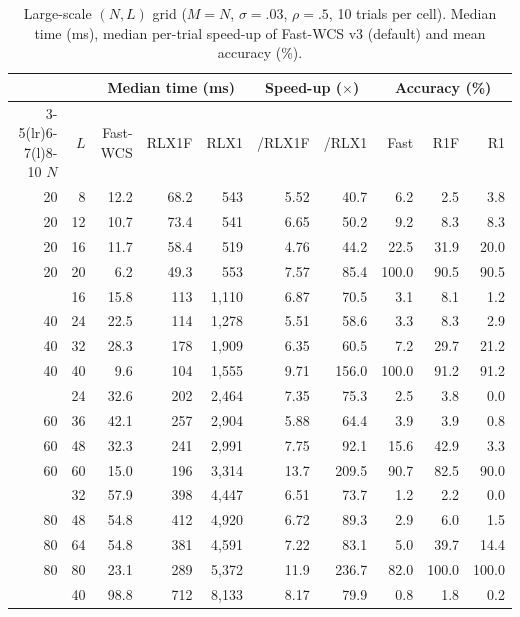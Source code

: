 \begin{table}[!t]
\centering
\caption{Large-scale $(N,L)$ grid ($M{=}N$, $\sigma{=}.03$, $\rho{=}.5$, 10 trials per cell). Median time (ms), median per-trial speed-up of Fast-WCS v3 (default) and mean accuracy (\%).}
\label{tab:grid}
\fontsize{5.9}{7.0}\selectfont
\setlength{\tabcolsep}{1.3pt}
\begin{tabular*}{\columnwidth}{@{\extracolsep{\fill}}rrrrrrrrrr@{}}
\toprule
 & & \multicolumn{3}{c}{Median time (ms)} & \multicolumn{2}{c}{Speed-up ($\times$)} & \multicolumn{3}{c}{Accuracy (\%)} \\
\cmidrule(lr){3-5}\cmidrule(lr){6-7}\cmidrule(l){8-10}
$N$ & $L$ & Fast-WCS & RLX1F & RLX1 & /RLX1F & /RLX1 & Fast & R1F & R1 \\
\midrule
20 & 8 & 12.2 & 68.2 & 543 & 5.52 & 40.7 & 6.2 & 2.5 & 3.8 \\
20 & 12 & 10.7 & 73.4 & 541 & 6.65 & 50.2 & 9.2 & 8.3 & 8.3 \\
20 & 16 & 11.7 & 58.4 & 519 & 4.76 & 44.2 & 22.5 & 31.9 & 20.0 \\
20 & 20 & 6.2 & 49.3 & 553 & 7.57 & 85.4 & 100.0 & 90.5 & 90.5 \\
\addlinespace[1pt]
40 & 16 & 15.8 & 113 & 1{,}110 & 6.87 & 70.5 & 3.1 & 8.1 & 1.2 \\
40 & 24 & 22.5 & 114 & 1{,}278 & 5.51 & 58.6 & 3.3 & 8.3 & 2.9 \\
40 & 32 & 28.3 & 178 & 1{,}909 & 6.35 & 60.5 & 7.2 & 29.7 & 21.2 \\
40 & 40 & 9.6 & 104 & 1{,}555 & 9.71 & 156.0 & 100.0 & 91.2 & 91.2 \\
\addlinespace[1pt]
60 & 24 & 32.6 & 202 & 2{,}464 & 7.35 & 75.3 & 2.5 & 3.8 & 0.0 \\
60 & 36 & 42.1 & 257 & 2{,}904 & 5.88 & 64.4 & 3.9 & 3.9 & 0.8 \\
60 & 48 & 32.3 & 241 & 2{,}991 & 7.75 & 92.1 & 15.6 & 42.9 & 3.3 \\
60 & 60 & 15.0 & 196 & 3{,}314 & 13.7 & 209.5 & 90.7 & 82.5 & 90.0 \\
\addlinespace[1pt]
80 & 32 & 57.9 & 398 & 4{,}447 & 6.51 & 73.7 & 1.2 & 2.2 & 0.0 \\
80 & 48 & 54.8 & 412 & 4{,}920 & 6.72 & 89.3 & 2.9 & 6.0 & 1.5 \\
80 & 64 & 54.8 & 381 & 4{,}591 & 7.22 & 83.1 & 5.0 & 39.7 & 14.4 \\
80 & 80 & 23.1 & 289 & 5{,}372 & 11.9 & 236.7 & 82.0 & 100.0 & 100.0 \\
\addlinespace[1pt]
100 & 40 & 98.8 & 712 & 8{,}133 & 8.17 & 79.9 & 0.8 & 1.8 & 0.2 \\

\end{tabular*}
\end{table}
